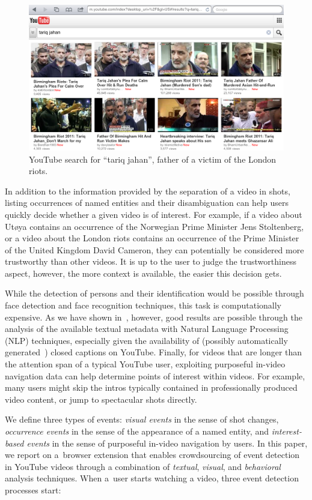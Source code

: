 \documentclass[runningheads,a4paper]{llncs}
\begin{document}
\begin{figure}[htb!]
  \begin{center}
   \includegraphics[width=0.7\linewidth]{./resources/tariq}
  \end{center}  
  \caption{YouTube search for ``tariq jahan'', father of a victim of the London riots.}
  \label{fig:thumbnails}
\end{figure}

In addition to the information provided by the separation of a video in shots, listing occurrences of named entities and their disambiguation can help users quickly decide whether a given video is of interest. For example, if a video about Ut\o ya contains an occurrence of the Norwegian Prime Minister Jens Stoltenberg, or a video about the London riots contains an occurrence of the Prime Minister of the United Kingdom David Cameron, they can potentially be considered more trustworthy than other videos. It is up to the user to judge the trustworthiness aspect, however, the more context is available, the easier this decision gets.

While the detection of persons and their identification would be possible through face detection and face recognition techniques, this task is computationally expensive. As we have shown in~\cite{semwebvid}, however, good results are possible through the analysis of the available textual metadata with Natural Language Processing (NLP) techniques, especially given the availability of (possibly automatically generated~\cite{youtubecaptions}) closed captions on YouTube. Finally, for videos that are longer than the attention span of a typical YouTube user, exploiting purposeful in-video navigation data can help determine points of interest within videos. For example, many users might skip the intros typically contained in professionally produced video content, or jump to spectacular shots directly.

We define three types of events: \emph{visual events} in the sense of shot changes, \emph{occurrence events} in the sense of the appearance of a named entity, and \emph{interest-based events} in the sense of purposeful in-video navigation by users. In this paper, we report on a~browser extension that enables crowdsourcing  of event detection in YouTube videos through a combination of \emph{textual}, \emph{visual}, and \emph{behavioral} analysis techniques. When a~user starts watching a video, three event detection processes start:
\end{document}
